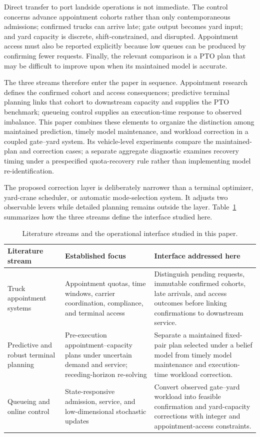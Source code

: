 \documentclass[preprint,12pt,authoryear,a4paper]{elsarticle}
\begin{document}
Direct transfer to port landside operations is not immediate. The control concerns advance appointment cohorts rather than only contemporaneous admissions; confirmed trucks can arrive late; gate output becomes yard input; and yard capacity is discrete, shift-constrained, and disrupted. Appointment access must also be reported explicitly because low queues can be produced by confirming fewer requests. Finally, the relevant comparison is a PTO plan that may be difficult to improve upon when its maintained model is accurate.

The three streams therefore enter the paper in sequence. Appointment research defines the confirmed cohort and access consequences; predictive terminal planning links that cohort to downstream capacity and supplies the PTO benchmark; queueing control supplies an execution-time response to observed imbalance. This paper combines these elements to organize the distinction among maintained prediction, timely model maintenance, and workload correction in a coupled gate--yard system. Its vehicle-level experiments compare the maintained-plan and correction cases; a separate aggregate diagnostic examines recovery timing under a prespecified quota-recovery rule rather than implementing model re-identification.

The proposed correction layer is deliberately narrower than a terminal optimizer, yard-crane scheduler, or automatic mode-selection system. It adjusts two observable levers while detailed planning remains outside the layer. Table~\ref{tab:literature-gap-map} summarizes how the three streams define the interface studied here.

\begin{table}[htbp]
\centering
\caption{Literature streams and the operational interface studied in this paper.}
\label{tab:literature-gap-map}
\footnotesize
\setlength{\tabcolsep}{4pt}
\begin{tabularx}{\textwidth}{>{\raggedright\arraybackslash}p{}>{\raggedright\arraybackslash}p{}>{\raggedright\arraybackslash}X}
\toprule
Literature stream & Established focus & Interface addressed here \\
\midrule
Truck appointment systems & Appointment quotas, time windows, carrier coordination, compliance, and terminal access & Distinguish pending requests, immutable confirmed cohorts, late arrivals, and access outcomes before linking confirmations to downstream service. \\
Predictive and robust terminal planning & Pre-execution appointment--capacity plans under uncertain demand and service; receding-horizon re-solving & Separate a maintained fixed-pair plan selected under a belief model from timely model maintenance and execution-time workload correction. \\
Queueing and online control & State-responsive admission, service, and low-dimensional stochastic updates & Convert observed gate--yard workload into feasible confirmation and yard-capacity corrections with integer and appointment-access constraints. \\
\bottomrule
\end{tabularx}
\end{table}
\end{document}

